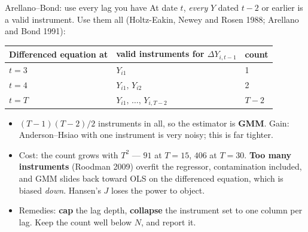 \documentclass[
  11pt,
  ignorenonframetext,
  aspectratio=169,
]{beamer}
\providecommand{\tightlist}{%
  \setlength{\itemsep}{0pt}\setlength{\parskip}{0pt}}
\begin{document}
\begin{frame}{Arellano--Bond: use every lag you have}
\protect{}\label{arellanobond-use-every-lag-you-have}
At date \(t\), \emph{every} \(Y\) dated \(t-2\) or earlier is a valid
instrument. Use them all (Holtz-Eakin, Newey and Rosen 1988; Arellano
and Bond 1991):

\begin{center}\small
\begin{tabular}{lll}
\toprule
Differenced equation at & valid instruments for $\Delta Y_{i,t-1}$ & count \\
\midrule
$t = 3$ & $Y_{i1}$ & 1 \\
$t = 4$ & $Y_{i1},\, Y_{i2}$ & 2 \\
$t = T$ & $Y_{i1},\, \dots,\, Y_{i,T-2}$ & $T-2$ \\
\bottomrule
\end{tabular}
\end{center}

\begin{itemize}
\tightlist
\item
  \((T-1)(T-2)/2\) instruments in all, so the estimator is \textbf{GMM}.
  Gain: Anderson--Hsiao with one instrument is very noisy; this is far
  tighter.
\item
  Cost: the count grows with \(T^2\) --- \(91\) at \(T = 15\), \(406\)
  at \(T = 30\). \textbf{Too many instruments} (Roodman 2009) overfit
  the regressor, contamination included, and GMM slides back toward OLS
  on the differenced equation, which is biased \emph{down}. Hansen's
  \(J\) loses the power to object.
\item
  Remedies: \textbf{cap} the lag depth, \textbf{collapse} the instrument
  set to one column per lag. Keep the count well below \(N\), and report
  it.
\end{itemize}
\end{frame}
\end{document}
